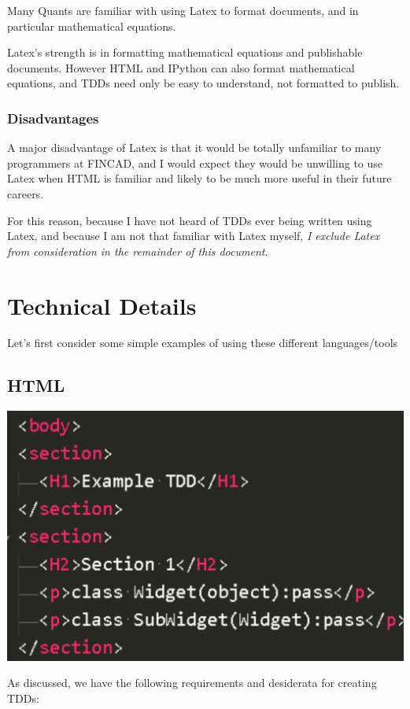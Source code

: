 \documentclass[]{article}
\begin{document}
	Many Quants are familiar with using Latex to format documents, and in particular mathematical equations.
	
	Latex's strength is in formatting mathematical equations and publishable documents.  However HTML and IPython can also format mathematical equations, and TDDs need only be easy to understand, not formatted to publish.
	
	\subsubsection{Disadvantages}
	A major disadvantage of Latex is that it would be totally unfamiliar to many programmers at FINCAD, and I would expect they would be unwilling to use Latex when HTML is familiar and likely to be much more useful in their future careers.
	
	For this reason, because I have not heard of TDDs ever being written using Latex, and because I am not that familiar with Latex myself, \emph{I exclude Latex from consideration in the remainder of this document}.




	

\section{Technical Details}
Let's first consider some simple examples of using these different languages/tools

\subsection{HTML}
\includegraphics[scale=.25]{HTML_code.PNG}

As discussed, we have the following requirements and desiderata for creating TDDs:
\end{document}

